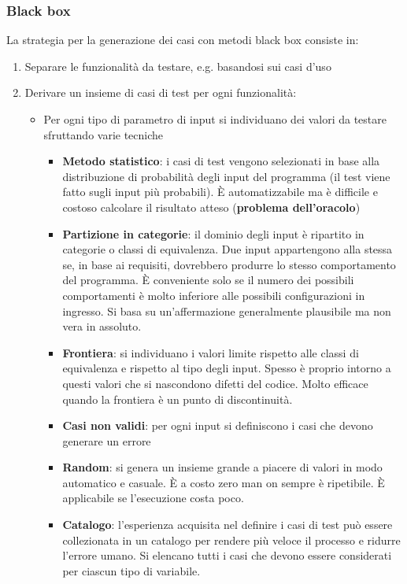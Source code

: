 \subsubsection{Black box}
La strategia per la generazione dei casi con metodi black box consiste in:
\begin{enumerate}
	\item Separare le funzionalità da testare, e.g. basandosi sui casi d'uso
	\item Derivare un insieme di casi di test per ogni funzionalità:
	\begin{itemize}
		\item Per ogni tipo di parametro di input si individuano dei valori da testare sfruttando varie tecniche
		\begin{itemize}
			\item \textbf{Metodo statistico}: i casi di test vengono selezionati in base alla distribuzione di probabilità degli input del programma (il test viene fatto sugli input più probabili). È automatizzabile ma è difficile e costoso calcolare il risultato atteso (\textbf{problema dell'oracolo})
			\item \textbf{Partizione in categorie}: il dominio degli input è ripartito in categorie o classi di equivalenza. Due input appartengono alla stessa se, in base ai requisiti, dovrebbero produrre lo stesso comportamento del programma. È conveniente solo se il numero dei possibili comportamenti è molto inferiore alle possibili configurazioni in ingresso. Si basa su un'affermazione generalmente plausibile ma non vera in assoluto.
			\item \textbf{Frontiera}: si individuano i valori limite rispetto alle classi di equivalenza e rispetto al tipo degli input. Spesso è proprio intorno a questi valori che si nascondono difetti del codice. Molto efficace quando la frontiera è un punto di discontinuità.
			\item \textbf{Casi non validi}: per ogni input si definiscono i casi che devono generare un errore
			\item \textbf{Random}: si genera un insieme grande a piacere di valori in modo automatico e casuale. È a costo zero man on sempre è ripetibile. È applicabile se l'esecuzione costa poco.
			\item \textbf{Catalogo}: l'esperienza acquisita nel definire i casi di test può essere collezionata in un catalogo per rendere più veloce il processo e ridurre l'errore umano. Si elencano tutti i casi che devono essere considerati per ciascun tipo di variabile.
		\end{itemize}

\end{itemize}
\end{enumerate}

